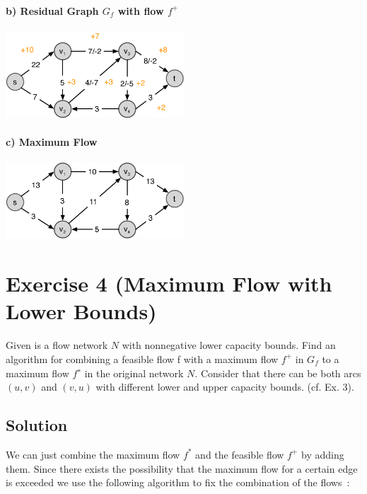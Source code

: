 \documentclass[a4paper, 12pt]{report}
\begin{document}
\paragraph{b) Residual Graph $G_f$ with flow $f^+$}

\begin{center}
    \includegraphics[width=0.5\textwidth]{Figures/Exercise_2_3_b}
\end{center}

\paragraph{c) Maximum Flow}

\begin{center}
    \includegraphics[width=0.5\textwidth]{Figures/Exercise_2_3_c}
\end{center}

\section{Exercise 4 (Maximum Flow with Lower Bounds)}

Given is a flow network $N$ with nonnegative lower capacity bounds. Find an
algorithm for combining a feasible flow f with a maximum flow $f^+$ in $G_f$ to
a maximum flow $f^∗$ in the original network $N$. Consider that there can be
both arcs $(u, v)$ and $(v, u)$ with different lower and upper capacity bounds.
(cf. Ex. 3).

\subsection{Solution}

We can just combine the maximum flow $f^*$ and the feasible flow $f^+$ by
adding them. Since there exists the possibility that the maximum flow for a
certain edge is exceeded we use the following algorithm to fix the combination
of the flows~\cite{Informatik_Forum_Combine_Flows}:
\end{document}
